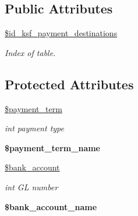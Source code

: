 \subsection*{Public Attributes}
\begin{DoxyCompactItemize}
\item 
\hypertarget{classksf__payment__destinations__model_a1d84e5bee08d75539901b64c2a91ef33}{}\label{classksf__payment__destinations__model_a1d84e5bee08d75539901b64c2a91ef33} 
\hyperlink{classksf__payment__destinations__model_a1d84e5bee08d75539901b64c2a91ef33}{\$id\+\_\+ksf\+\_\+payment\+\_\+destinations}
\begin{DoxyCompactList}\small\item\em Index of table. \end{DoxyCompactList}\end{DoxyCompactItemize}
\subsection*{Protected Attributes}
\begin{DoxyCompactItemize}
\item 
\hypertarget{classksf__payment__destinations__model_ae9dd219bca42c65addf8f9eccf7269c1}{}\label{classksf__payment__destinations__model_ae9dd219bca42c65addf8f9eccf7269c1} 
\hyperlink{classksf__payment__destinations__model_ae9dd219bca42c65addf8f9eccf7269c1}{\$payment\+\_\+term}
\begin{DoxyCompactList}\small\item\em int payment type \end{DoxyCompactList}\item 
\hypertarget{classksf__payment__destinations__model_ac310931c57a514ef142670c439e1bda3}{}\label{classksf__payment__destinations__model_ac310931c57a514ef142670c439e1bda3} 
{\bfseries \$payment\+\_\+term\+\_\+name}
\item 
\hypertarget{classksf__payment__destinations__model_ade020a8ffe44944d26991547fc546d2a}{}\label{classksf__payment__destinations__model_ade020a8ffe44944d26991547fc546d2a} 
\hyperlink{classksf__payment__destinations__model_ade020a8ffe44944d26991547fc546d2a}{\$bank\+\_\+account}
\begin{DoxyCompactList}\small\item\em int GL number \end{DoxyCompactList}\item 
\hypertarget{classksf__payment__destinations__model_a43c542537d304e0ae3d37b11102b333d}{}\label{classksf__payment__destinations__model_a43c542537d304e0ae3d37b11102b333d} 
{\bfseries \$bank\+\_\+account\+\_\+name}
\end{DoxyCompactItemize}



